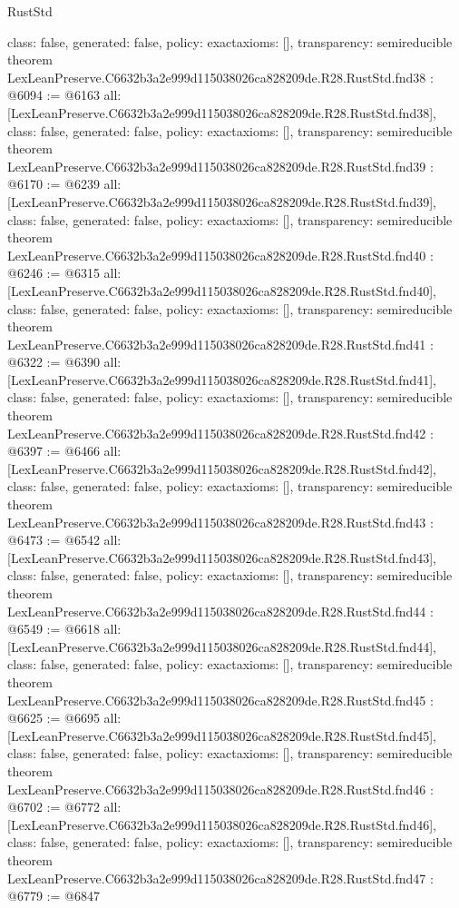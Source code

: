 \begin{lexlean}{RustStd}
\begin{coremodule}
{  class: false,
  generated: false,
  policy: exact{axioms: []},
  transparency: semireducible
}
theorem LexLeanPreserve.C6632b3a2e999d115038026ca828209de.R28.RustStd.fnd38 : @6094 := @6163 {
  all: [LexLeanPreserve.C6632b3a2e999d115038026ca828209de.R28.RustStd.fnd38],
  class: false,
  generated: false,
  policy: exact{axioms: []},
  transparency: semireducible
}
theorem LexLeanPreserve.C6632b3a2e999d115038026ca828209de.R28.RustStd.fnd39 : @6170 := @6239 {
  all: [LexLeanPreserve.C6632b3a2e999d115038026ca828209de.R28.RustStd.fnd39],
  class: false,
  generated: false,
  policy: exact{axioms: []},
  transparency: semireducible
}
theorem LexLeanPreserve.C6632b3a2e999d115038026ca828209de.R28.RustStd.fnd40 : @6246 := @6315 {
  all: [LexLeanPreserve.C6632b3a2e999d115038026ca828209de.R28.RustStd.fnd40],
  class: false,
  generated: false,
  policy: exact{axioms: []},
  transparency: semireducible
}
theorem LexLeanPreserve.C6632b3a2e999d115038026ca828209de.R28.RustStd.fnd41 : @6322 := @6390 {
  all: [LexLeanPreserve.C6632b3a2e999d115038026ca828209de.R28.RustStd.fnd41],
  class: false,
  generated: false,
  policy: exact{axioms: []},
  transparency: semireducible
}
theorem LexLeanPreserve.C6632b3a2e999d115038026ca828209de.R28.RustStd.fnd42 : @6397 := @6466 {
  all: [LexLeanPreserve.C6632b3a2e999d115038026ca828209de.R28.RustStd.fnd42],
  class: false,
  generated: false,
  policy: exact{axioms: []},
  transparency: semireducible
}
theorem LexLeanPreserve.C6632b3a2e999d115038026ca828209de.R28.RustStd.fnd43 : @6473 := @6542 {
  all: [LexLeanPreserve.C6632b3a2e999d115038026ca828209de.R28.RustStd.fnd43],
  class: false,
  generated: false,
  policy: exact{axioms: []},
  transparency: semireducible
}
theorem LexLeanPreserve.C6632b3a2e999d115038026ca828209de.R28.RustStd.fnd44 : @6549 := @6618 {
  all: [LexLeanPreserve.C6632b3a2e999d115038026ca828209de.R28.RustStd.fnd44],
  class: false,
  generated: false,
  policy: exact{axioms: []},
  transparency: semireducible
}
theorem LexLeanPreserve.C6632b3a2e999d115038026ca828209de.R28.RustStd.fnd45 : @6625 := @6695 {
  all: [LexLeanPreserve.C6632b3a2e999d115038026ca828209de.R28.RustStd.fnd45],
  class: false,
  generated: false,
  policy: exact{axioms: []},
  transparency: semireducible
}
theorem LexLeanPreserve.C6632b3a2e999d115038026ca828209de.R28.RustStd.fnd46 : @6702 := @6772 {
  all: [LexLeanPreserve.C6632b3a2e999d115038026ca828209de.R28.RustStd.fnd46],
  class: false,
  generated: false,
  policy: exact{axioms: []},
  transparency: semireducible
}
theorem LexLeanPreserve.C6632b3a2e999d115038026ca828209de.R28.RustStd.fnd47 : @6779 := @6847 {
}
\end{coremodule}
\end{lexlean}
